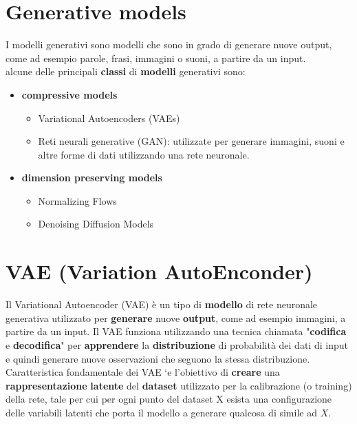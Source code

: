 \documentclass{article}
\begin{document}
\section{Generative models}
I modelli generativi sono modelli che sono in grado di generare nuove output, come ad esempio parole, frasi, immagini o suoni, a partire da un input.\\
alcune delle principali \textbf{classi} di \textbf{modelli} generativi sono:
\begin{itemize}
\item \textbf{compressive models}
\begin{itemize}
    \item Variational Autoencoders (VAEs)
    \item Reti neurali generative (GAN): utilizzate per generare immagini, suoni e altre forme di dati utilizzando una rete neuronale.
\end{itemize}
    \item \textbf{dimension preserving models}
    \begin{itemize}
        \item Normalizing Flows
        \item Denoising Diffusion Models
    \end{itemize}
\end{itemize}

\section{VAE (Variation AutoEnconder)}
Il Variational Autoencoder (VAE) è un tipo di \textbf{modello} di rete neuronale generativa utilizzato per \textbf{generare} nuove \textbf{output}, come ad esempio immagini, a partire da un input. Il VAE funziona utilizzando una tecnica chiamata "\textbf{codifica} e \textbf{decodifica}" per \textbf{apprendere} la \textbf{distribuzione} di probabilità dei dati di input e quindi generare nuove osservazioni che seguono la stessa distribuzione.\\
Caratteristica fondamentale dei VAE `e l’obiettivo di \textbf{creare} una \textbf{rappresentazione}
\textbf{latente} del \textbf{dataset} utilizzato per la calibrazione (o training) della rete, tale per cui
per ogni punto del dataset X esista una configurazione delle variabili latenti che porta il
modello a generare qualcosa di simile ad $X$.
\end{document}
